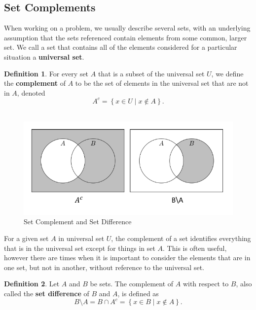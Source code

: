 \documentclass[
]{book}
\theoremstyle{definition}
\newtheorem{definition}{Definition}[chapter]
\theoremstyle{definition}
\theoremstyle{definition}
\theoremstyle{remark}
\begin{document}
\hypertarget{set-complements}{%
\subsection{Set Complements}\label{set-complements}}

When working on a problem, we usually describe several sets, with an underlying assumption that the sets referenced contain elements from some common, larger set. We call a set that contains all of the elements considered for a particular situation a \textbf{universal set}.

\begin{definition}
\protect\hypertarget{def:unnamed-chunk-21}{}{\label{def:unnamed-chunk-21} }For every set \(A\) that is a subset of the universal set \(U\), we define the \textbf{complement} of \(A\) to be the set of elements in the universal set that are not in \(A\), denoted
\[A^c=\left\{ x\in U \middle \vert x \notin A\right\}.\]\\
\end{definition}

\begin{figure}

{\centering \includegraphics[width=0.8\linewidth]{tikz/set-difference} 

}

\caption{Set Complement and Set Difference}\label{fig:set-difference}
\end{figure}

For a given set \(A\) in universal set \(U\), the complement of a set identifies everything that is in the universal set except for things in set \(A\). This is often useful, however there are times when it is important to consider the elements that are in one set, but not in another, without reference to the universal set.

\begin{definition}
\protect\hypertarget{def:unnamed-chunk-22}{}{\label{def:unnamed-chunk-22} } Let \(A\) and \(B\) be sets. The complement of \(A\) with respect to \(B\), also called the \textbf{set difference} of \(B\) and \(A\), is defined as
\[B\setminus A = B \cap A^c = \left\{x\in B \middle \vert x \notin A\right\}.\]
\end{definition}
\end{document}
